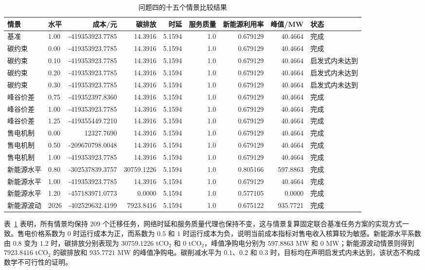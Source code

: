 \documentclass[withoutpreface,bwprint]{cumcmthesis}
\begin{document}
\begin{table}[htbp]
\centering
\caption{问题四的十五个情景比较结果}
\label{tab:q4_scenarios}
\begin{tabular}{llrrrrrrl}
\toprule
情景 & 水平 & 成本/元 & 碳排放 & 时延 & 服务质量 & 新能源利用率 & 峰值/MW & 状态\\
\midrule
基准 & 1.00 & -419353923.7785 & 14.3916 & 5.1594 & 1.0 & 0.679129 & 40.4664 & 完成\\
碳约束 & 0.00 & -419353923.7785 & 14.3916 & 5.1594 & 1.0 & 0.679129 & 40.4664 & 完成\\
碳约束 & 0.10 & -419353923.7785 & 14.3916 & 5.1594 & 1.0 & 0.679129 & 40.4664 & 启发式内未达到\\
碳约束 & 0.20 & -419353923.7785 & 14.3916 & 5.1594 & 1.0 & 0.679129 & 40.4664 & 启发式内未达到\\
碳约束 & 0.30 & -419353923.7785 & 14.3916 & 5.1594 & 1.0 & 0.679129 & 40.4664 & 启发式内未达到\\
峰谷价差 & 0.75 & -419352397.8360 & 14.3916 & 5.1594 & 1.0 & 0.679129 & 40.4664 & 完成\\
峰谷价差 & 1.00 & -419353923.7785 & 14.3916 & 5.1594 & 1.0 & 0.679129 & 40.4664 & 完成\\
峰谷价差 & 1.25 & -419355449.7210 & 14.3916 & 5.1594 & 1.0 & 0.679129 & 40.4664 & 完成\\
售电机制 & 0.00 & 12327.7690 & 14.3916 & 5.1594 & 1.0 & 0.679129 & 40.4664 & 完成\\
售电机制 & 0.50 & -209670798.0048 & 14.3916 & 5.1594 & 1.0 & 0.679129 & 40.4664 & 完成\\
售电机制 & 1.00 & -419353923.7785 & 14.3916 & 5.1594 & 1.0 & 0.679129 & 40.4664 & 完成\\
新能源水平 & 0.80 & -302537839.3757 & 30759.1226 & 5.1594 & 1.0 & 0.805166 & 597.8863 & 完成\\
新能源水平 & 1.00 & -419353923.7785 & 14.3916 & 5.1594 & 1.0 & 0.679129 & 40.4664 & 完成\\
新能源水平 & 1.20 & -457183971.0773 & 0.0000 & 5.1594 & 1.0 & 0.577105 & 0.0000 & 完成\\
新能源波动 & 2026 & -402529632.4199 & 7923.8416 & 5.1594 & 1.0 & 0.675122 & 935.7721 & 完成\\
\bottomrule
\end{tabular}
\end{table}

表~\ref{tab:q4_scenarios} 表明，所有情景均保持 $209$ 个迁移任务，网络时延和服务质量代理也保持不变，这与情景复算固定联合基准任务方案的实现方式一致。售电价格系数为 $0$ 时运行成本为正，而系数为 $0.5$ 和 $1$ 时运行成本为负，说明当前成本指标对售电收入核算较为敏感。新能源水平系数由 $0.8$ 变为 $1.2$ 时，碳排放分别表现为 $30759.1226$ tCO$_2$ 和 $0$ tCO$_2$，峰值净购电分别为 $597.8863$ MW 和 $0$ MW；新能源波动情景则得到 $7923.8416$ tCO$_2$ 的碳排放和 $935.7721$ MW 的峰值净购电。碳削减水平为 $0.1$、$0.2$ 和 $0.3$ 时，目标均在声明启发式内未达到，该状态不构成数学不可行性的证明。
\end{document}
